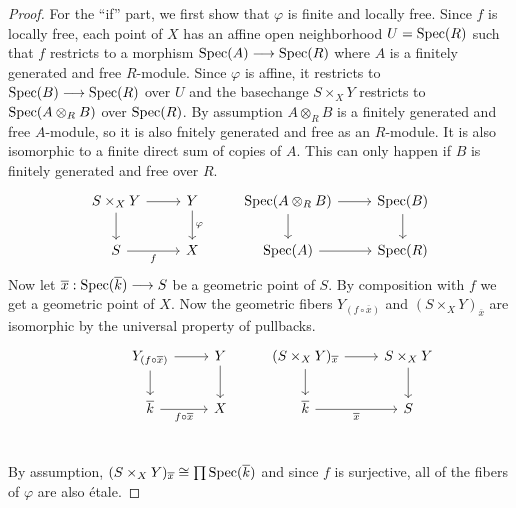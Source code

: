 \begin{proof}
  For the ``if'' part, we first show that $\varphi$ is finite and locally free. Since $f$ is locally free, each point of $X$ has an affine open neighborhood $U = \operatorname{Spec}(R)$ such that $f$ restricts to a morphism $\operatorname{Spec}(A) \longrightarrow \operatorname{Spec}(R)$ where $A$ is a finitely generated and free $R$-module. Since $\varphi$ is affine, it restricts to $\operatorname{Spec}(B) \longrightarrow \operatorname{Spec}(R)$ over $U$ and the basechange $S \times_X Y$ restricts to $\operatorname{Spec}(A \otimes_R B)$ over $\operatorname{Spec}(R)$. By assumption $A \otimes_R B$ is a finitely generated and free $A$-module, so it is also fnitely generated and free as an $R$-module. It is also isomorphic to a finite direct sum of copies of $A$. This can only happen if $B$ is finitely generated and free over $R$.
    \[
    \begin{tikzcd}
    	{S \times_X Y} & Y & {\Spec(A \otimes_RB)} & {\Spec(B)} \\
    	S & X & {\Spec(A)} & {\Spec(R)}
    	\arrow["\varphi", from=1-2, to=2-2]
    	\arrow["f"', from=2-1, to=2-2]
    	\arrow[from=1-1, to=1-2]
    	\arrow[from=1-1, to=2-1]
    	\arrow[from=1-3, to=2-3]
    	\arrow[from=2-3, to=2-4]
    	\arrow[from=1-3, to=1-4]
    	\arrow[from=1-4, to=2-4]
    \end{tikzcd}
    \]
  Now let $\overline{x} : \operatorname{Spec}(\overline{k}) \longrightarrow S$ be a geometric point of $S$. By composition with $f$ we get a geometric point of $X$. Now the geometric fibers $Y_{(f \circ \overline{x})}$ and $(S \times_X Y)_{\overline{x}}$  are isomorphic by the universal property of pullbacks. 
  \[
\begin{tikzcd}
	& {Y_{(f \circ \overline{x})}} & Y & {(S \times_X Y)_{\overline{x}}} & {S \times_X Y} \\
	& {\overline{k}} & X & {\overline{k}} & S \\
	{}
	\arrow[from=1-3, to=2-3]
	\arrow[from=1-2, to=1-3]
	\arrow["{f \circ \overline{x}}"', from=2-2, to=2-3]
	\arrow[from=1-2, to=2-2]
	\arrow[from=1-4, to=2-4]
	\arrow[from=1-4, to=1-5]
	\arrow[from=1-5, to=2-5]
	\arrow["{\overline{x}}"', from=2-4, to=2-5]
\end{tikzcd}
\]
By assumption, $(S\times_X Y)_{\overline{x}} \cong \prod \operatorname{Spec}(\overline{k})$ and since $f$ is surjective, all of the fibers of $\varphi$ are also \'etale.
\end{proof}
